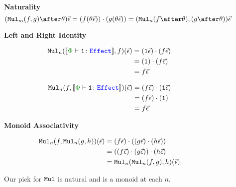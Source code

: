     \begin{figure}
        \begin{framed}
            \begin{framed}
                \centering\textbf{Naturality} 
                \begin{equation*}
                    (\Mul_m(f, g)\after \theta)\ev = (f(\theta\ev))\dot(g(\theta\ev)) = (\Mul_n(f\after\theta), (g\after\theta))\ev
                \end{equation*}
            \end{framed} 
            
            \begin{framed}
                \centering\textbf{Left and Right Identity}
    
    
                \begin{minipage}{.45\textwidth}
                    \begin{align*}
                        \Mul_n(\deno{\typerelation{\P}{\1}{\effect}}, f)(\ev) & = (\1\ev)\dot(f\ev)\\
                        & = (\1)\dot(f\ev)\\
                        & = f\ev\\
                    \end{align*}
                \end{minipage}
                \quad
                \begin{minipage}{.45\textwidth}
                    \begin{align*}
                        \Mul_n(f, \deno{\typerelation{\P}{\1}{\effect}})(\ev) & = (f\ev)\dot(\1\ev)\\
                        & = (f\ev)\dot(\1)\\
                        & = f\ev\\
                    \end{align*}
                \end{minipage}
            \end{framed}
    
            \begin{framed}
                \centering\textbf{Monoid Associativity}
    
                \begin{align*}
                    \texttt{Mul}_n(f, \texttt{Mul}_n(g, h))(\vec{\epsilon}) & = (f\vec{\epsilon})\cdot((g\vec{\epsilon})\cdot(h\vec{\epsilon}))\\
                    & = ((f\vec{\epsilon})\cdot(g\vec{\epsilon}))\cdot(h\vec{\epsilon})\\
                    & = \texttt{Mul}_n(\texttt{Mul}_n(f,g), h)(\vec{\epsilon})
                \end{align*}
            \end{framed}
        \end{framed}
        
        
        \caption{Our pick for $\texttt{Mul}$ is natural and is a monoid at each $n$.}
        \label{MulMonoidAndNatural}
    \end{figure}
    
